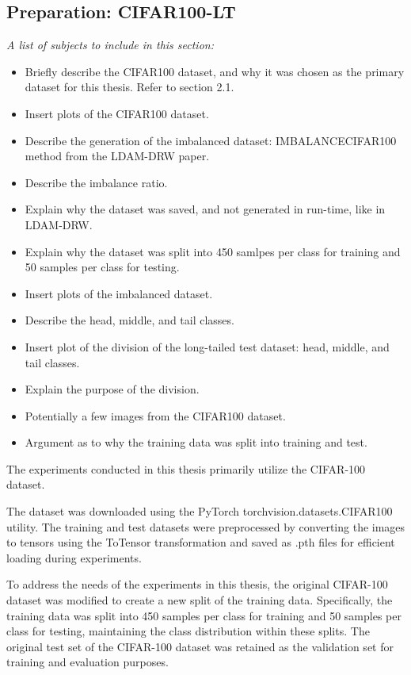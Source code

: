 \subsection{Preparation: CIFAR100-LT}
\textit{A list of subjects to include in this section:}

\begin{itemize}
    \item Briefly describe the CIFAR100 dataset, and why it was chosen as the primary dataset for this thesis. Refer to section 2.1.
    \item Insert plots of the CIFAR100 dataset.
    \item Describe the generation of the imbalanced dataset: IMBALANCECIFAR100 method from the LDAM-DRW paper.
    \item Describe the imbalance ratio.
    \item Explain why the dataset was saved, and not generated in run-time, like in LDAM-DRW.
    \item Explain why the dataset was split into 450 samlpes per class for training and 50 samples per class for testing.
    \item Insert plots of the imbalanced dataset.
    \item Describe the head, middle, and tail classes.
    \item Insert plot of the division of the long-tailed test dataset: head, middle, and tail classes.
    \item Explain the purpose of the division.
    \item Potentially a few images from the CIFAR100 dataset.
    \item Argument as to why the training data was split into training and test.
\end{itemize}

The experiments conducted in this thesis primarily utilize the CIFAR-100 dataset.

The dataset was downloaded using the PyTorch torchvision.datasets.CIFAR100 utility. The training and test datasets were preprocessed by converting the images to tensors using the ToTensor transformation and saved as .pth files for efficient loading during experiments. 

To address the needs of the experiments in this thesis, the original CIFAR-100 dataset was modified to create a new split of the training data. Specifically, the training data was split into 450 samples per class for training and 50 samples per class for testing, maintaining the class distribution within these splits. The original test set of the CIFAR-100 dataset was retained as the validation set for training and evaluation purposes.

